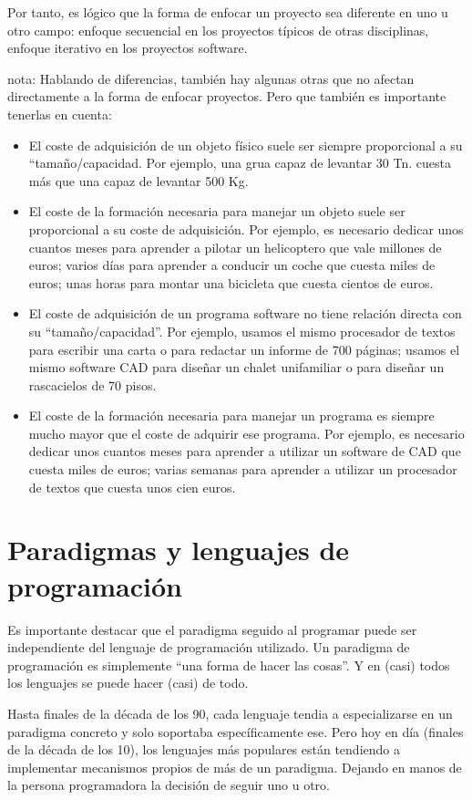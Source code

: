 \documentclass[spanish,12pt,a4paper,final,oneside]{book}
\begin{document}
Por tanto, es lógico que la forma de enfocar un proyecto sea diferente en uno u otro campo: enfoque secuencial en los proyectos típicos de otras disciplinas, enfoque iterativo en los proyectos software.

nota: Hablando de diferencias, también hay algunas otras que no afectan directamente a la forma de enfocar proyectos. Pero que también es importante tenerlas en cuenta:
\begin{itemize}
\item El coste de adquisición de un objeto físico suele ser siempre proporcional a su ``tamaño/capacidad. Por ejemplo, una grua capaz de levantar 30 Tn. cuesta más que una capaz de levantar 500 Kg.
\item El coste de la formación necesaria para manejar un objeto suele ser proporcional a su coste de adquisición. Por ejemplo, es necesario dedicar unos cuantos meses para aprender a pilotar un helicoptero que vale millones de euros; varios días para aprender a conducir un coche que cuesta miles de euros; unas horas para montar una bicicleta que cuesta cientos de euros.
\item El coste de adquisición de un programa software no tiene relación directa con su ``tamaño/capacidad''. Por ejemplo, usamos el mismo procesador de textos para escribir una carta o para redactar un informe de 700 páginas; usamos el mismo software CAD para diseñar un chalet unifamiliar o para diseñar un rascacielos de 70 pisos.
\item El coste de la formación necesaria para manejar un programa es siempre mucho mayor que el coste de adquirir ese programa. Por ejemplo, es necesario dedicar unos cuantos meses para aprender a utilizar un software de CAD que cuesta miles de euros; varias semanas para aprender a utilizar un procesador de textos que cuesta unos cien euros.
\end{itemize}

\chapter{Paradigmas y lenguajes de programación}
Es importante destacar que el paradigma seguido al programar puede ser independiente del lenguaje de programación utilizado. Un paradigma de programación es simplemente ``una forma de hacer las cosas''. Y en (casi) todos los lenguajes se puede hacer (casi) de todo.

Hasta finales de la década de los 90, cada lenguaje tendia a especializarse en un paradigma concreto y solo soportaba específicamente ese. Pero hoy en día (finales de la década de los 10), los lenguajes más populares están tendiendo a implementar mecanismos propios de más de un paradigma. Dejando en manos de la persona programadora la decisión de seguir uno u otro.
\end{document}

